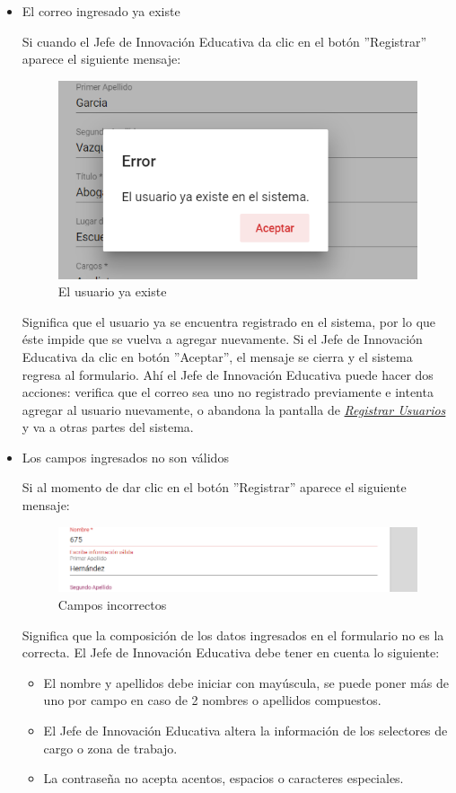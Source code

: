 \begin{itemize}
	\item El correo ingresado ya existe

	Si cuando el Jefe de Innovación Educativa da clic en el botón ''Registrar'' aparece el siguiente mensaje:

	\begin{figure}[H]
		\centering
		\includegraphics[width=0.4\linewidth]{images/SP5/MSG36}
		\caption{El usuario ya existe}
		\label{mensaje36}

	\end{figure}

	Significa que el usuario ya se encuentra registrado en el sistema, por lo que éste impide que se vuelva a agregar nuevamente. Si el Jefe de Innovación Educativa da clic en botón ''Aceptar'', el mensaje se cierra y el sistema regresa al formulario. Ahí el Jefe de Innovación Educativa  puede hacer dos acciones: verifica que el correo sea uno no registrado previamente e intenta agregar al usuario nuevamente, o abandona la pantalla de \hyperlink{registrarUs}{\textit{Registrar Usuarios}} y va a otras partes del sistema.
	\newpage
	\item Los campos ingresados no son válidos

	Si al momento de dar clic en el botón ''Registrar'' aparece el siguiente mensaje:
	\begin{figure}[H]
		\centering
		\includegraphics[width=0.4\linewidth]{images/SP5/MSG35}
		\caption{Campos incorrectos}
		\label{mensaje35}

	\end{figure}

	Significa que la composición de los datos ingresados en el formulario no es la correcta. El Jefe de Innovación Educativa debe tener en cuenta lo siguiente:

	\begin{itemize}
		\item El nombre y apellidos debe iniciar con mayúscula, se puede poner más de uno por campo en caso de 2 nombres o apellidos compuestos.
		\item El Jefe de Innovación Educativa altera la información de los selectores de cargo o zona de trabajo.
		\item La contraseña no acepta acentos, espacios o caracteres especiales.
	\end{itemize}

\end{itemize}

